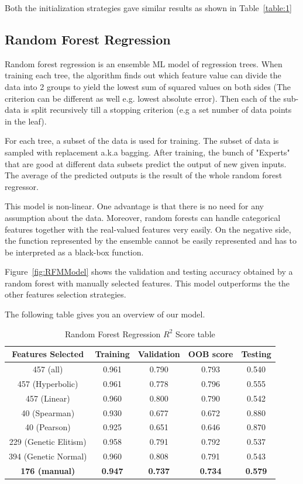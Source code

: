 \documentclass[11pt]{article}
\begin{document}
Both the initialization strategies gave similar results as shown in Table~\ref{table:1}

\subsection{Random Forest Regression}
Random forest regression is an ensemble ML model of regression trees.
When training each tree,  the algorithm finds out which feature value can divide the data into 2 groups to yield the lowest sum of squared values on both sides (The criterion can be different as well e.g. lowest absolute error).
Then each of the sub-data is split recursively till a stopping criterion (e.g a set number of data points in the leaf).

For each tree,  a subset of the data is used for training. 
The subset of data is sampled with replacement a.k.a bagging.
After training,  the bunch of "Experts" that are good at different data subsets predict the output of new given inputs.
The average of the predicted outputs is the result of the whole random forest regressor.

This model is non-linear.
One advantage is that there is no need for any assumption about the data.
Moreover,  random forests can handle categorical features together with the real-valued features very easily.
On the negative side,  the function represented by the ensemble cannot be easily represented and has to be interpreted as a black-box function.

Figure~\ref{fig:RFMModel} shows the validation and testing accuracy obtained by a random forest with manually selected features.
This model outperforms the the other features selection strategies.

The following table gives you an overview of our model.

\begin{table} [h!]
\centering
 \begin{tabular}{ | c | c | c | c | c |}
\hline
\textbf{Features Selected} & \textbf{Training} & \textbf{Validation} & \textbf{OOB score} & \textbf{Testing} \\ [0.5 ex]
\hline \hline
457 (all) & 0.961 & 0.790 & 0.793 & 0.540\\
457 (Hyperbolic) &  0.961 & 0.778 & 0.796 & 0.555\\
457 (Linear)  &  0.960 & 0.800 & 0.790 & 0.542\\
40 (Spearman) &  0.930 & 0.677 & 0.672 & 0.880  \\ 
40 (Pearson) &  0.925 & 0.651 & 0.646 & 0.870  \\ 
229 (Genetic Elitism)  & 0.958 &  0.791 & 0.792 & 0.537 \\
394 (Genetic Normal) & 0.960 & 0.808 & 0.791 & 0.543 \\
\textbf{176 (manual)}  &  \textbf{0.947} & \textbf{0.737} & \textbf{0.734} & \textbf{0.579}  \\ [1ex]
\hline
\end{tabular}
\caption{Random Forest Regression $R^2$ Score table}
\label {table:3}
\end{table}
\end{document}
